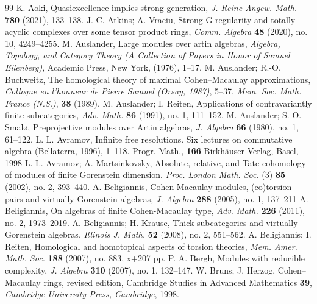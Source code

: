 \documentclass{amsart}
\theoremstyle{definition}
\theoremstyle{remark}
\numberwithin{equation}{thm}
\begin{document}
\begin{thebibliography}{99}
{\sc K. Aoki}, Quasiexcellence implies strong generation, {\it J. Reine Angew. Math.} {\bf 780} (2021), 133--138.
{\sc J. C. Atkins; A. Vraciu}, Strong G-regularity and totally acyclic complexes over some tensor product rings, {\em Comm. Algebra} {\bf 48} (2020), no. 10, 4249--4255.
{\sc M. Auslander}, Large modules over artin algebras, {\it Algebra, Topology, and Category Theory
(A Collection of Papers in Honor of Samuel Eilenberg)}, Academic Press, New York, (1976), 1--17.
{\sc M. Auslander; R.-O. Buchweitz}, The homological theory of maximal Cohen--Macaulay approximations, {\it Colloque en l'honneur de Pierre Samuel (Orsay, 1987)}, 5--37, {\it Mem. Soc. Math. France (N.S.)}, {\bf 38} (1989).
{\sc M. Auslander; I. Reiten}, Applications of contravariantly finite subcategories, {\it Adv. Math.} {\bf 86} (1991), no. 1, 111--152.
{\sc M. Auslander; S. O. Smal{\o}}, Preprojective modules over {A}rtin algebras, {\it J. Algebra} {\bf 66} (1980), no. 1, 61--122.
{\sc L. L. Avramov}, Infinite free resolutions. Six lectures on commutative algebra (Bellaterra, 1996), 1--118. Progr. Math., {\bf 166} Birkh\"{a}user Verlag, Basel, 1998
{\sc L. L. Avramov; A. Martsinkovsky}, Absolute, relative, and Tate cohomology of modules of finite Gorenstein dimension. {\em Proc. London Math. Soc.} (3) {\bf 85} (2002), no. 2, 393--440.
{\sc A. Beligiannis}, Cohen-Macaulay modules, (co)torsion pairs and virtually Gorenstein algebras, {\it J. Algebra} {\bf 288} (2005), no. 1, 137--211
{\sc A. Beligiannis}, On algebras of finite Cohen-Macaulay type, {\it Adv. Math.} {\bf 226} (2011), no. 2, 1973--2019.
{\sc A. Beligiannis; H. Krause}, Thick subcategories and virtually Gorenstein algebras, {\em Illinois J. Math.} {\bf 52} (2008), no. 2, 551--562.
{\sc A. Beligiannis; I. Reiten}, Homological and homotopical aspects of torsion theories, {\em Mem. Amer. Math. Soc.} {\bf 188} (2007), no. 883, x+207 pp.
{\sc P. A. Bergh}, Modules with reducible complexity, {\em J. Algebra} {\bf 310} (2007), no. 1, 132--147.
{\sc W. Bruns; J. Herzog}, Cohen--Macaulay rings, revised edition, Cambridge Studies in Advanced Mathematics {\bf 39}, {\it Cambridge University Press, Cambridge}, 1998.

\end{thebibliography}
\end{document}
